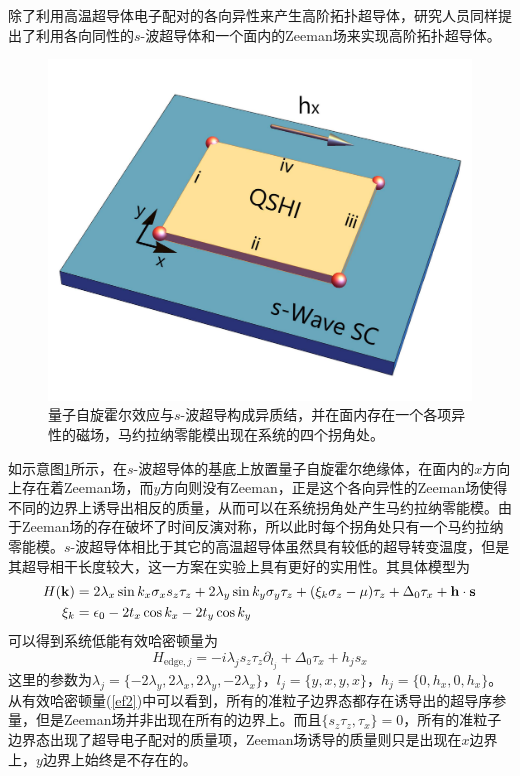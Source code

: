 除了利用高温超导体电子配对的各向异性来产生高阶拓扑超导体，研究人员同样提出了利用各向同性的$s$-波超导体和一个面内的Zeeman场来实现高阶拓扑超导体\cite{re45}。
\begin{figure}[h]
\centering
\includegraphics[scale=0.2]{pic/fig14.pdf}
\caption{量子自旋霍尔效应与$s$-波超导构成异质结，并在面内存在一个各项异性的磁场，马约拉纳零能模出现在系统的四个拐角处\cite{re45}。}\label{fig13}
\end{figure}
如示意图\ref{fig13}所示，在$s$-波超导体的基底上放置量子自旋霍尔绝缘体，在面内的$x$方向上存在着Zeeman场，而$y$方向则没有Zeeman，正是这个各向异性的Zeeman场使得不同的边界上诱导出相反的质量，从而可以在系统拐角处产生马约拉纳零能模。由于Zeeman场的存在破坏了时间反演对称，所以此时每个拐角处只有一个马约拉纳零能模。$s$-波超导体相比于其它的高温超导体虽然具有较低的超导转变温度，但是其超导相干长度较大，这一方案在实验上具有更好的实用性。其具体模型为
\begin{equation}
\begin{aligned}
H(\mathbf{k})&=2\lambda_x\sin k_x\sigma_xs_z\tau_z+2\lambda_y\sin k_y\sigma_y\tau_z+(\xi_k\sigma_z-\mu)\tau_z+\Delta_0\tau_x+{\bf h\cdot s}\\
\xi_k&=\epsilon_0-2t_x\cos k_x-2t_y\cos k_y\label{ze1}
\end{aligned}
\end{equation}
可以得到系统低能有效哈密顿量为
\begin{equation}
H_{\textrm{edge},j}=-i\lambda_js_z\tau_z\partial_{l_j}+\Delta_0\tau_x+h_js_x\label{ef2}
\end{equation}
这里的参数为$\lambda_j=\{-2\lambda_y,2\lambda_x,2\lambda_y,-2\lambda_x\}，l_j=\{y,x,y,x\}，h_j=\{0,h_x,0,h_x\}$。从有效哈密顿量(\ref{ef2})中可以看到，所有的准粒子边界态都存在诱导出的超导序参量，但是Zeeman场并非出现在所有的边界上。而且$\{s_z\tau_z,\tau_x\}=0$，所有的准粒子边界态出现了超导电子配对的质量项，Zeeman场诱导的质量则只是出现在$x$边界上，$y$边界上始终是不存在的。

